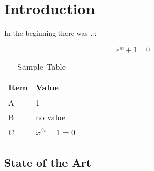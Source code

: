 \documentclass[letterpaper,12pt,titlepage,oneside,final]{report}
\begin{document}
 


\chapter{Introduction}
In the beginning there was $\pi$:

\begin{equation}
  e^{\pi i} + 1 = 0  \label{eqn_pi}
\end{equation}

\begin{table}[ht]
  \centering
  \begin{tabular}{|l|l|}
    \hline
    Item & Value \\
    \hline 
    A & 1 \\
    B & no value \\
    C & $x^{\beta i} - 1 = 0$ \\
    \hline
  \end{tabular}
  \caption{Sample Table}
\end{table}
\section{State of the Art}
\end{document}
